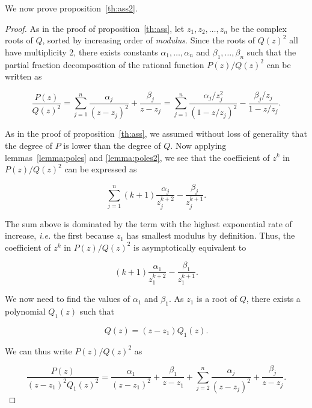 \documentclass{article}
\begin{document}
We now prove proposition~\ref{th:ass2}.

\begin{proof}
As in the proof of proposition~\ref{th:ass}, let $z_1, z_2, \ldots, z_n$
be the complex roots of $Q$, sorted by increasing order of
\textit{modulus}. Since the roots of $Q(z)^2$ all have multiplicity 2,
there exists constants $\alpha_1, \ldots, \alpha_n$ and $\beta_1, \ldots,
\beta_n$ such that the partial fraction decomposition of the rational
function $P(z)/Q(z)^2$ can be written as

\begin{equation*}
\frac{P(z)}{Q(z)^2} = 
\sum_{j=1}^n \frac{\alpha_j}{(z-z_j)^2} + \frac{\beta_j}{z-z_j} =
\sum_{j=1}^n \frac{\alpha_j/z_j^2}{(1-z/z_j)^2}
-\frac{\beta_j/z_j}{1-z/z_j}.
\end{equation*}

As in the proof of proposition~\ref{th:ass}, we assumed without loss of
generality that the degree of $P$ is lower than the degree of $Q$. Now
applying lemmas~\ref{lemma:poles} and \ref{lemma:poles2}, we see that
the coefficient of $z^k$ in $P(z)/Q(z)^2$ can be expressed as

\begin{equation}
\label{eq:fullass2}
\sum_{j=1}^n (k+1)\frac{\alpha_j}{z_j^{k+2}}-\frac{\beta_j}{z_j^{k+1}}.
\end{equation}

The sum above is dominated by the term with the highest exponential rate
of increase, \textit{i.e.} the first because $z_1$ has smallest modulus by
definition. Thus, the coefficient of $z^k$ in $P(z)/Q(z)^2$ is
asymptotically equivalent to 

\begin{equation*}
(k+1)\frac{\alpha_1}{z_1^{k+2}}-\frac{\beta_1}{z_1^{k+1}}.
\end{equation*}

We now need to find the values of $\alpha_1$ and $\beta_1$. As $z_1$ is a
root of $Q$, there exists a polynomial $Q_1(z)$ such that

\begin{equation}
\label{eq:Q1}
Q(z) = (z-z_1)Q_1(z).
\end{equation}

We can thus write $P(z)/Q(z)^2$ as

\begin{equation}
\label{eq:misc1}
\frac{P(z)}{(z-z_1)^2Q_1(z)^2} = \frac{\alpha_1}{(z-z_1)^2} +
\frac{\beta_1}{z-z_1} +
\sum_{j=2}^n \frac{\alpha_j}{(z-z_j)^2} + \frac{\beta_j}{z-z_j}.
\end{equation}


\end{proof}
\end{document}
